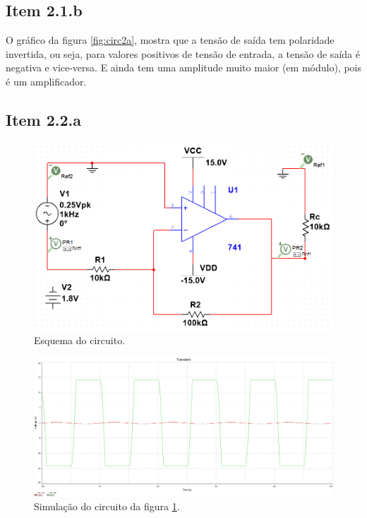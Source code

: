 \documentclass[11pt]{article}
\begin{document}
\pagebreak

\subsection*{Item 2.1.b}

O gráfico da figura \ref{fig:circ2a}, mostra que a tensão de saída tem polaridade invertida, ou seja,  para valores positivos de tensão de entrada, a tensão de saída é negativa e vice-versa. E ainda tem  uma amplitude muito maior (em módulo), pois é um amplificador.

\subsection*{Item 2.2.a}

\begin{figure}[h!]
  \centering
  \includegraphics[width=.8\textwidth]{fig/circ2_b}
  \caption{Esquema do circuito.}
  \label{fig:circ2b}
\end{figure}

\begin{figure}[h!]
  \centering
  \includegraphics[width=\textwidth]{fig/sim2_b}
  \caption{Simulação do circuito da figura \ref{fig:circ2b}.}
  \label{fig:2-2b}
\end{figure}
\end{document}
